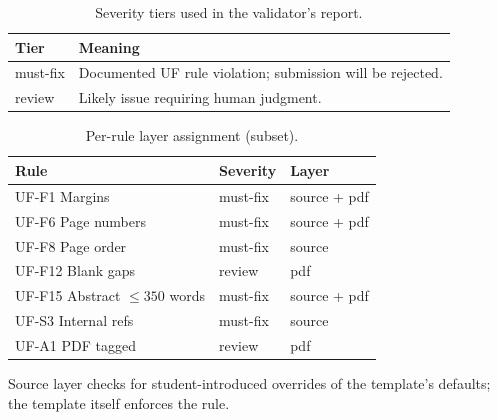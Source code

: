 
\begin{table}[h]
\caption{Severity tiers used in the validator's report.}
\label{tab:severity}
\centering
\begin{tabular}{ll}
\hline
Tier & Meaning \\
\hline
must-fix & Documented UF rule violation; submission will be rejected. \\
review   & Likely issue requiring human judgment. \\
\hline
\end{tabular}
\end{table}

\begin{table}[h]
\caption{Per-rule layer assignment (subset).}
\label{tab:layers}
\centering
\begin{threeparttable}
\begin{tabular}{lll}
\hline
Rule & Severity & Layer \\
\hline
UF-F1  Margins       & must-fix & source\tnote{a} + pdf \\
UF-F6  Page numbers  & must-fix & source\tnote{a} + pdf \\
UF-F8  Page order    & must-fix & source                \\
UF-F12 Blank gaps    & review   & pdf                   \\
UF-F15 Abstract $\leq 350$ words & must-fix & source + pdf \\
UF-S3  Internal refs & must-fix & source                \\
UF-A1  PDF tagged    & review   & pdf                   \\
\hline
\end{tabular}
\begin{tablenotes}\small
\item[a] Source layer checks for student-introduced overrides of the
template's defaults; the template itself enforces the rule.
\end{tablenotes}
\end{threeparttable}
\end{table}

